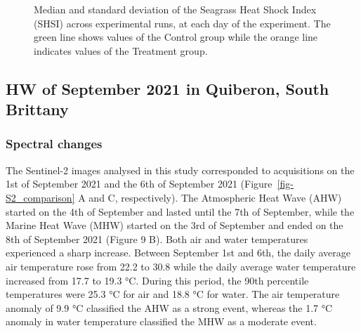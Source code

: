 \documentclass[
  letterpaper,
  11pt,
  english,
  singlespacing,
  headsepline]{MastersDoctoralThesis}
\begin{document}
\begin{spacing}{1.5}
\begin{figure}


\caption{\label{fig-SDI_over_Time_h}Median and standard deviation of the
Seagrass Heat Shock Index (SHSI) across experimental runs, at each day
of the experiment. The green line shows values of the Control group
while the orange line indicates values of the Treatment group.}

\end{figure}%

\subsection{HW of September 2021 in Quiberon, South
Brittany}\label{hw-of-september-2021-in-quiberon-south-brittany}

\subsubsection{Spectral changes}\label{spectral-changes}

The Sentinel-2 images analysed in this study corresponded to
acquisitions on the 1st of September 2021 and the 6th of September 2021
(Figure~\ref{fig-S2_comparison} A and C, respectively). The Atmospheric
Heat Wave (AHW) started on the 4th of September and lasted until the 7th
of September, while the Marine Heat Wave (MHW) started on the 3rd of
September and ended on the 8th of September 2021 (Figure 9 B). Both air
and water temperatures experienced a sharp increase. Between September
1st and 6th, the daily average air temperature rose from 22.2 to 30.8
while the daily average water temperature increased from 17.7 to 19.3
°C. During this period, the 90th percentile temperatures were 25.3 °C
for air and 18.8 °C for water. The air temperature anomaly of 9.9 °C
classified the AHW as a strong event, whereas the 1.7 °C anomaly in
water temperature classified the MHW as a moderate event.


\end{spacing}
\end{document}
